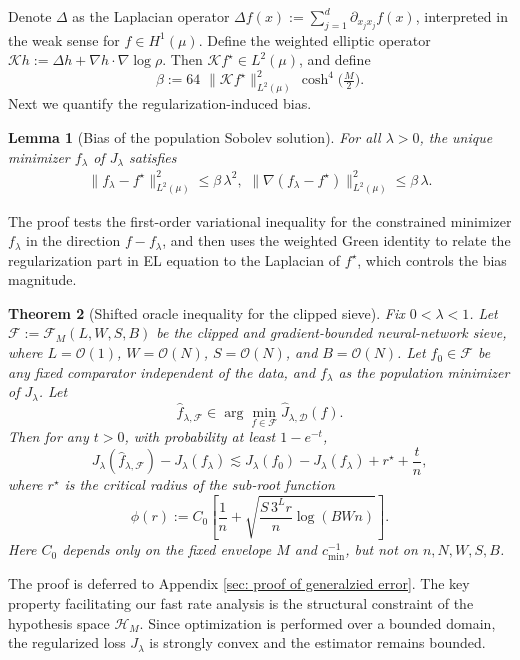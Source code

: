 \documentclass[11pt]{article}
\newcommand{\cH}{\mathcal{H}}
\theoremstyle{plain}
\newtheorem{theorem}{Theorem}[section]
\newtheorem{lemma}[theorem]{Lemma}
\theoremstyle{definition}
\theoremstyle{remark}
\begin{document}
Denote $\Delta$ as the Laplacian operator
$\Delta f(x):= \sum_{j=1}^d \partial_{x_j x_j} f(x)$, interpreted in the weak sense for $f\in H^1(\mu)$.
 Define the weighted elliptic operator
$
  \mathcal K h:= \Delta h + \nabla h\cdot\nabla\log \rho.
$
Then \(\mathcal K f^\star\in L^2(\mu)\), and define
\[
\beta:=
  64\,\,\|{\mathcal K f^\star}\|^2_{L^2(\mu)}\,\cosh^4\!\big(\tfrac{M}{2}\big).
\]
Next we quantify the regularization-induced bias.
\begin{lemma}[Bias of the population Sobolev solution]
\label{lem:bias}
For all $\lambda>0$, the unique minimizer $f_\lambda$
of $J_\lambda$ satisfies
\begin{eqnarray*}
     \|f_\lambda-f^\star\|_{L^2(\mu)}^2
  \le \beta\,\lambda^2,\,\, \|\nabla(f_\lambda-f^\star)\|_{L^2(\mu)}^2
  \le \beta\,\lambda.
\end{eqnarray*}
\end{lemma}
The proof tests the first-order variational inequality for the constrained minimizer $f_\lambda$ in the direction $f-f_\lambda$, and then uses the weighted Green identity to relate the regularization part in EL equation to the Laplacian of $f^\star$, which controls the bias magnitude.


\begin{theorem}[Shifted oracle inequality for the clipped sieve]
\label{thm: generalized error}
Fix \(0<\lambda<1\). Let $\mathcal F:=\mathcal F_M(L,W,S,B)$ be the clipped and gradient-bounded neural-network sieve, where
\(L=\mathcal{O}(1)\), \(W=\mathcal{O}(N)\), \(S=\mathcal{O}(N)\), and \(B=\mathcal{O}(N)\).
Let \(f_0\in\mathcal F\) be any fixed comparator independent of the data, and  \(f_\lambda\) as the population minimizer of \(J_\lambda\). Let
\[
\widehat f_{\lambda,\mathcal F}
\in
\arg\min_{f\in\mathcal F}
\widehat J_{\lambda,\mathcal D}(f).
\]
Then for any \(t>0\), with probability at least \(1-e^{-t}\),
\begin{equation}
\label{eq:shifted-oracle}
J_\lambda(\widehat f_{\lambda,\mathcal F})
-
J_\lambda(f_\lambda)
\lesssim
J_\lambda(f_0)
-
J_\lambda(f_\lambda)
+
r^\star
+
\frac{t}{n},
\end{equation}
where \(r^\star\) is the critical radius of the sub-root function
\[
\phi(r):=
{C_0}\left[
\frac{1}{n}
+
\sqrt{
\frac{S\,3^L r}{n}\log(BWn)
}
\right].
\]
Here \({C_0}\) depends only on the fixed envelope \(M\) and \(c_{\min}^{-1}\),
but not on \(n,N,W,S,B\).
\end{theorem}

The proof is deferred to Appendix \ref{sec: proof of generalzied error}. The key property facilitating our fast rate analysis is the structural constraint of the hypothesis space $\cH_M$. Since optimization is performed over a bounded domain, the regularized loss $J_\lambda$ is strongly convex and the estimator remains bounded.
\end{document}
